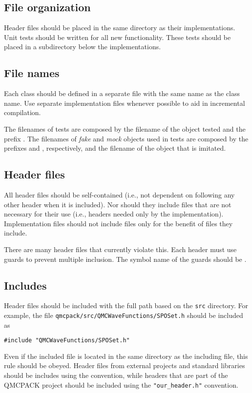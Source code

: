 \subsection{File organization}
Header files should be placed in the same directory as their implementations. 
Unit tests should be written for all new functionality. These tests should be placed in a  subdirectory below the implementations.

\subsection{File names}
Each class should be defined in a separate file with the same name as the class name. Use separate  implementation files whenever possible to aid in incremental compilation. 

The filenames of tests are composed by the filename of the object tested and the prefix .
The filenames of \emph{fake} and \emph{mock} objects used in tests are composed by the prefixes  and , respectively, and the filename of the object that is imitated.

\subsection{Header files}
All header files should be self-contained (i.e., not dependent on following any other header when it is included). Nor should they include files that are not necessary for their use (i.e., headers needed only by the implementation). Implementation files should not include files only for the benefit of files they include.

There are many header files that currently violate this.
Each header must use  guards to prevent multiple inclusion.
The symbol name of the  guards should be .

\subsection{Includes}
Header files should be included with the full path based on the \verb|src| directory.
For example, the file \verb|qmcpack/src/QMCWaveFunctions/SPOSet.h| should be included as
\begin{lstlisting}
#include "QMCWaveFunctions/SPOSet.h"
\end{lstlisting}
Even if the included file is located in the same directory as the including file, this rule should be obeyed. Header files from external projects and standard libraries should be includes using the  convention, while headers that are part of the QMCPACK project should be included using the \verb|"our_header.h"| convention.

